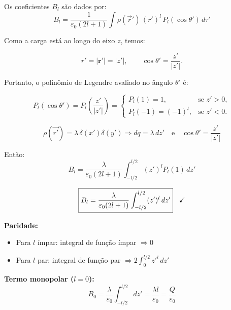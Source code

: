 \documentclass[a4paper,12pt]{article}
\begin{document}
\begin{flushleft}
Os coeficientes \( B_l \) são dados por:
\begin{equation}
B_l = \frac{1}{\varepsilon_0 (2l+1)} \int \rho(\vec{r}') \, (r')^l \, P_l(\cos\theta') \, d\tau'
\end{equation}

Como \colorbox{green!25}{a carga está ao longo do eixo \( z \)}, temos:

\[
r' = |\bm{r}'| = |z'|, \qquad \cos\theta' = \frac{z'}{|z'|}.
\]

Portanto, \colorbox{green!25}{o polinômio de Legendre avaliado no ângulo $\theta'$} é:

\[
P_l(\cos\theta') = P_l\left( \frac{z'}{|z'|} \right) =
\begin{cases}
\boxed{P_l(1) = 1}, & \text{se } z' > 0, \\
P_l(-1) = (-1)^l, & \text{se } z' < 0.
\end{cases}
\]

\begin{equation}
\rho(\vec{r'}) = \lambda \, \delta(x') \delta(y') \Rightarrow dq = \lambda \, dz'
\quad \text{e} \quad \cos\theta' = \frac{z'}{|z'|}
\end{equation}

Então:
\begin{equation}
\boxed{
B_l = \frac{\lambda}{\varepsilon_0(2l+1)} \int_{-l/2}^{l/2} (z')^l P_l(1)\, dz'}
\end{equation}

\begin{equation}
\boxed{
B_l = \frac{\lambda}{\varepsilon_0(2l+1)} \int_{-l/2}^{l/2} (z')^l \, dz'
} \hspace{0.3cm} \checkmark
\end{equation}

\textbf{Paridade:}
\begin{itemize}
\item \colorbox{red!15}{Para \( l \) ímpar: integral de função ímpar \(\Rightarrow 0\)}
\item \colorbox{green!15}{Para \( l \) par: integral de função par \(\Rightarrow 2 \int_0^{l/2} z'^l \, dz'\)}
\end{itemize}

\vspace{0.3cm}
\noindent
\colorbox{green!15}{\textbf{Termo monopolar (\( l = 0 \)):}}
\begin{equation}
B_0 = \frac{\lambda}{\varepsilon_0} \int_{-l/2}^{l/2} dz' = \frac{\lambda l}{\varepsilon_0} = \frac{Q}{\varepsilon_0}
\end{equation}


\end{flushleft}
\end{document}
